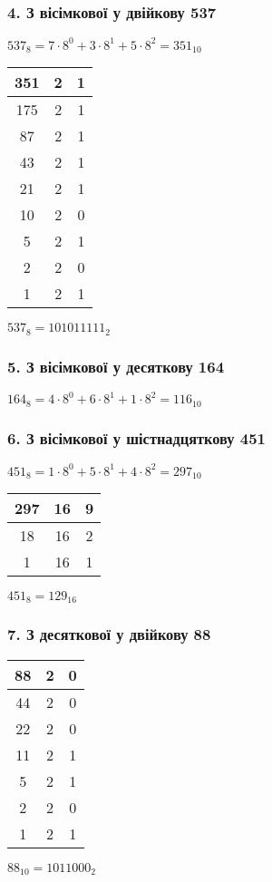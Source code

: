 \documentclass[14pt]{extreport}
\begin{document}
\subsubsection{4. З вісімкової  у двійкову 537 }
$537_8=7\cdot8^0+3\cdot8^1+5\cdot8^2=351_{10}$

\bigskip
\begin{tabular}{c|c|c}
	351 & 2 & 1 \\
	\hline
	175 & 2 & 1 \\
	\hline
	87 & 2 & 1 \\
	\hline
	43 & 2 & 1 \\
	\hline
	21 & 2 & 1 \\
	\hline
	10 & 2 & 0 \\
	\hline
	5 & 2 & 1 \\
	\hline
	2 & 2 & 0 \\
	\hline
	1 & 2 & 1\\
\end{tabular}
\hspace{.1\textwidth}
$537_8=101011111_2$

\subsubsection{5. З вісімкової  у десяткову 164 }
$164_8=4\cdot8^0+6\cdot8^1+1\cdot8^2=116_{10}$
\subsubsection{6. З вісімкової  у шістнадцяткову 451 }
$451_8=1\cdot8^0+5\cdot8^1+4\cdot8^2=297_{10}$

\bigskip
\begin{tabular}{c|c|c}
	297 & 16  & 9 \\
	\hline
	18 & 16 & 2 \\
	\hline
	1 & 16 & 1 \\
\end{tabular}
\hspace{.1\textwidth}
$451_8=129_{16}$

\subsubsection{7. З десяткової у двійкову 88 }
\begin{tabular}{c|c|c}
	88 & 2 & 0 \\
	\hline
	44 & 2 & 0 \\
	\hline
	22 & 2 & 0 \\
	\hline
	11 & 2 & 1 \\
	\hline
	5 & 2 & 1 \\
	\hline
	2 & 2 & 0 \\
	\hline
	1 & 2 & 1 \\
\end{tabular}
\hspace{.1\textwidth}
$88_{10}=1011000_2$
\end{document}
